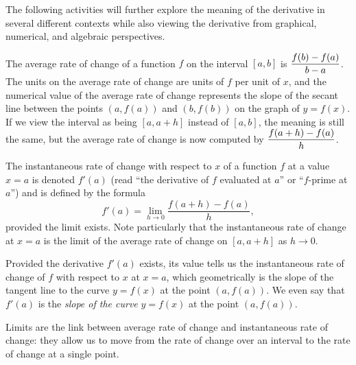 The following activities will further explore the meaning of the derivative in several different contexts while also viewing the derivative from graphical, numerical, and algebraic perspectives.




\begin{summary}
\item The average rate of change of a function $f$ on the interval $[a,b]$ is $\displaystyle \frac{f(b)-f(a)}{b-a}$.  The units on the average rate of change are units of $f$ per unit of $x$, and the numerical value of the average rate of change represents the slope of the secant line between the points $(a,f(a))$ and $(b,f(b))$ on the graph of $y = f(x)$.  If we view the interval as being $[a,a+h]$ instead of $[a,b]$, the meaning is still the same, but the average rate of change is now computed by  $\displaystyle \frac{f(a+h)-f(a)}{h}$.

\item The instantaneous rate of change with respect to $x$ of a function $f$ at a value $x = a$ is denoted $f'(a)$ (read ``the derivative of $f$ evaluated at $a$'' or ``$f$-prime at $a$'') and is defined by the formula
$$f'(a) = \lim_{h \to 0} \frac{f(a+h)-f(a)}{h},$$
provided the limit exists.  Note particularly that the instantaneous rate of change at $x = a$ is the limit of the average rate of change on $[a,a+h]$ as $h \to 0$.

\item Provided the derivative $f'(a)$  exists, its value tells us the instantaneous rate of change of $f$ with respect to $x$ at $x = a$, which geometrically is the slope of the tangent line to the curve $y = f(x)$ at the point $(a,f(a))$.  We even say that $f'(a)$ is the \emph{slope of the curve} $y = f(x)$ at the point $(a,f(a))$.

\item Limits are the link between average rate of change and instantaneous rate of change: they allow us to move from the rate of change over an interval to the rate of change at a single point.



\end{summary}
